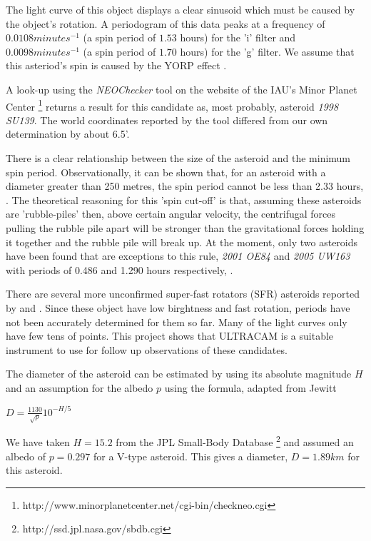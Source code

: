   The light curve of this object displays a clear sinusoid which must be caused by the object's rotation. A periodogram of this data peaks at a frequency of $0.0108 minutes^{-1}$ (a spin period of $1.53$ hours) for the 'i' filter and $0.0098 minutes^{-1}$ (a spin period of $1.70$ hours) for the 'g' filter. We assume that this asteriod's spin is caused by the YORP effect \cite{yorpeffect}. 

  A look-up using the \emph{NEOChecker} tool on the website of the IAU's Minor Planet Center \footnote{http://www.minorplanetcenter.net/cgi-bin/checkneo.cgi} returns a result for this candidate as, most probably, asteroid \emph{1998 SU139}. The world coordinates reported by the tool differed from our own determination by about 6.5'. 

  There is a clear relationship between the size of the asteroid and the minimum spin period. Observationally, it can be shown that, for an asteroid with a diameter greater than 250 metres, the spin period cannot be less than 2.33 hours, \cite{Jacobson2014}. The theoretical reasoning for this 'spin cut-off'  is that, assuming these asteroids are 'rubble-piles' then, above certain angular velocity, the centrifugal forces pulling the rubble pile apart will be stronger than the gravitational forces holding it together and the rubble pile will break up. At the moment, only two asteroids have been found that are exceptions to this rule, \emph{2001 OE84} and \emph{2005 UW163} with periods of 0.486 and 1.290 hours respectively, \cite{Chang2014}. 

  There are several more unconfirmed super-fast rotators (SFR) asteroids reported by \cite{Masiero2009} and \cite{Dermawan2011}. Since these object have low birghtness and fast rotation, periods have not been accurately determined for them so far. Many of the light curves only have few tens of points. This project shows that ULTRACAM is a suitable instrument to use for follow up observations of these candidates.  

  The diameter of the asteroid can be estimated by using its absolute magnitude $H$ and an assumption for the albedo $p$ using the formula, adapted from Jewitt \cite{Jewitt2013}

  $D = \frac{1130}{\sqrt{p}}10^{-H/5} $

  We have taken $H = 15.2$ from the JPL Small-Body Database \footnote{http://ssd.jpl.nasa.gov/sbdb.cgi} and assumed an albedo of $ p = 0.297$ for a V-type asteroid. This gives a diameter, $D = 1.89 km$ for this asteroid. 

